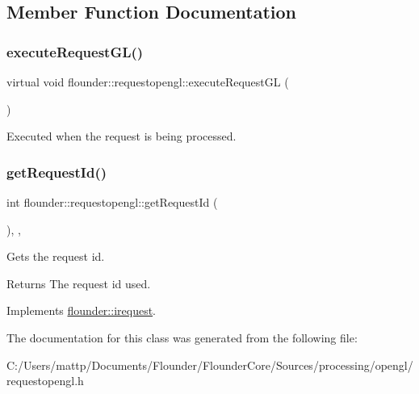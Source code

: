 \subsection{Member Function Documentation}
\mbox{\label{classflounder_1_1requestopengl_abc16ac9157ca6f6ebd3a556469ad5d51}} 
\subsubsection{\texorpdfstring{execute\+Request\+G\+L()}{executeRequestGL()}}
{\footnotesize\ttfamily virtual void flounder\+::requestopengl\+::execute\+Request\+GL (\begin{DoxyParamCaption}{ }\end{DoxyParamCaption})\hspace{0.3cm}{\ttfamily [pure virtual]}}



Executed when the request is being processed. 

\mbox{\label{classflounder_1_1requestopengl_a897fbd9310873f5a2972764b5d855409}} 
\subsubsection{\texorpdfstring{get\+Request\+Id()}{getRequestId()}}
{\footnotesize\ttfamily int flounder\+::requestopengl\+::get\+Request\+Id (\begin{DoxyParamCaption}{ }\end{DoxyParamCaption})\hspace{0.3cm}{\ttfamily [inline]}, {\ttfamily [override]}, {\ttfamily [virtual]}}



Gets the request id. 

\begin{DoxyReturn}{Returns}
The request id used. 
\end{DoxyReturn}


Implements \hyperlink{classflounder_1_1irequest_a69e6b820c6635486e488e6aa18b11730}{flounder\+::irequest}.



The documentation for this class was generated from the following file\+:\begin{DoxyCompactItemize}
\item 
C\+:/\+Users/mattp/\+Documents/\+Flounder/\+Flounder\+Core/\+Sources/processing/opengl/requestopengl.\+h\end{DoxyCompactItemize}
